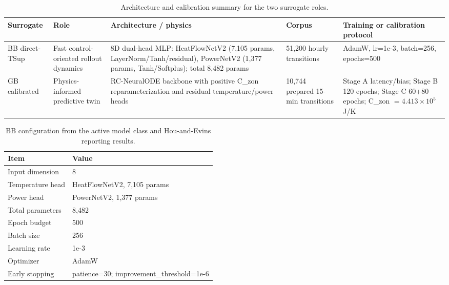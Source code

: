 \documentclass[11pt,a4paper]{article}
\begin{document}
\begin{table}[H]
\centering
\scriptsize
\caption{Architecture and calibration summary for the two surrogate roles.}
\label{tab:architecture-summary}
\begin{tabularx}{\linewidth}{lXXXX}
\toprule
Surrogate & Role & Architecture / physics & Corpus & Training or calibration protocol \\
\midrule
BB direct-TSup & Fast control-oriented rollout dynamics & 8D dual-head MLP: HeatFlowNetV2 (7,105 params, LayerNorm/Tanh/residual), PowerNetV2 (1,377 params, Tanh/Softplus); total 8,482 params & 51,200 hourly transitions & AdamW, lr=1e-3, batch=256, epochs=500 \\
GB calibrated & Physics-informed predictive twin & RC-NeuralODE backbone with positive C\_zon reparameterization and residual temperature/power heads & 10,744 prepared 15-min transitions & Stage A latency/bias; Stage B 120 epochs; Stage C 60+80 epochs; C\_zon $=4.413\times10^5$ J/K \\
\bottomrule
\end{tabularx}
\end{table}
\begin{table}[H]
\centering
\small
\caption{BB configuration from the active model class and Hou-and-Evins reporting results.}
\label{tab:v3-config}
\begin{tabularx}{0.86\linewidth}{lX}
\toprule
Item & Value \\
\midrule
Input dimension & 8 \\
Temperature head & HeatFlowNetV2, 7,105 params \\
Power head & PowerNetV2, 1,377 params \\
Total parameters & 8,482 \\
Epoch budget & 500 \\
Batch size & 256 \\
Learning rate & 1e-3 \\
Optimizer & AdamW \\
Early stopping & patience=30; improvement\_threshold=1e-6 \\
\bottomrule
\end{tabularx}
\end{table}
\end{document}
